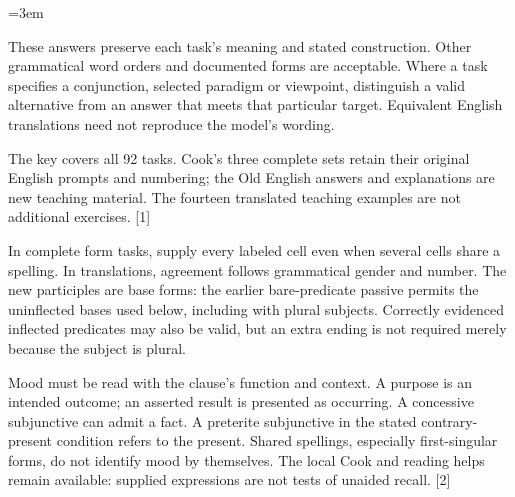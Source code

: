\newcommand{\runningtitle}{Unit 11. Answer key}

\emergencystretch=3em
\newcommand{\itempara}[2]{\par\addvspace{3pt}\noindent\hangindent=1.8em\hangafter=1\makebox[1.8em][l]{#1.}#2\par}
\newcommand{\reserve}[1]{\par\penalty-100\begingroup\dimen0=\pagegoal\advance\dimen0 by-\pagetotal\ifdim\dimen0<#1\newpage\fi\endgroup}

\raggedright
{}

These answers preserve each task's meaning and stated construction. Other grammatical word orders and documented forms are acceptable. Where a task specifies a conjunction, selected paradigm or viewpoint, distinguish a valid alternative from an answer that meets that particular target. Equivalent English translations need not reproduce the model's wording.

The key covers all 92 tasks. Cook's three complete sets retain their original English prompts and numbering; the Old English answers and explanations are new teaching material. The fourteen translated teaching examples are not additional exercises. [1]

In complete form tasks, supply every labeled cell even when several cells share a spelling. In translations, agreement follows grammatical gender and number. The new participles are base forms: the earlier bare-predicate passive permits the uninflected bases used below, including with plural subjects. Correctly evidenced inflected predicates may also be valid, but an extra ending is not required merely because the subject is plural.

Mood must be read with the clause's function and context. A purpose is an intended outcome; an asserted result is presented as occurring. A concessive subjunctive can admit a fact. A preterite subjunctive in the stated contrary-present condition refers to the present. Shared spellings, especially first-singular forms, do not identify mood by themselves. The local Cook and reading helps remain available: supplied expressions are not tests of unaided recall. [2]

